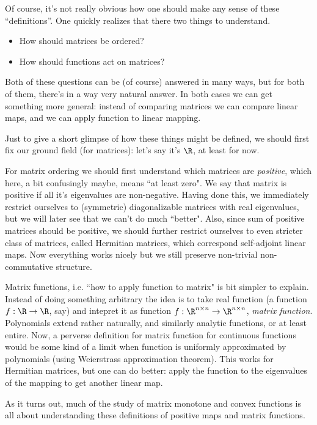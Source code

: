 Of course, it's not really obvious how one should make any sense of these ``definitions''. One quickly realizes that there two things to understand.
\begin{itemize}
	\item How should matrices be ordered?
	\item How should functions act on matrices?
\end{itemize}
Both of these questions can be (of course) answered in many ways, but for both of them, there's in a way very natural answer. In both cases we can get something more general: instead of comparing matrices we can compare linear maps, and we can apply function to linear mapping.

Just to give a short glimpse of how these things might be defined, we should first fix our ground field (for matrices): let's say it's $\R$, at least for now.

For matrix ordering we should first understand which matrices are \textit{positive}, which here, a bit confusingly maybe, means ``at least zero". We say that matrix is positive if all it's eigenvalues are non-negative. Having done this, we immediately restrict ourselves to (symmetric) diagonalizable matrices with real eigenvalues, but we will later see that we can't do much ``better". Also, since sum of positive matrices should be positive, we should further restrict ourselves to even stricter class of matrices, called Hermitian matrices, which correspond self-adjoint linear maps. Now everything works nicely but we still preserve non-trivial non-commutative structure.

Matrix functions, i.e. ``how to apply function to matrix" is bit simpler to explain. Instead of doing something arbitrary the idea is to take real function (a function $f : \R \to \R$, say) and intepret it as function $f : \R^{n \times n} \to \R^{n \times n}$, \textit{matrix function}. Polynomials extend rather naturally, and similarly analytic functions, or at least entire. Now, a perverse definition for matrix function for continuous functions would be some kind of a limit when function is uniformly approximated by polynomials (using Weierstrass approximation theorem). This works for Hermitian matrices, but one can do better: apply the function to the eigenvalues of the mapping to get another linear map.

As it turns out, much of the study of matrix monotone and convex functions is all about understanding these definitions of positive maps and matrix functions.

